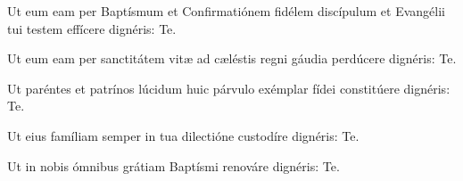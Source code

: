  Ut
\ifparvulus
eum
\else
eam
\fi
per Baptísmum et Confirmatiónem fidélem
discípulum et Evangélii tui testem effícere dignéris: \Rbardot{} Te.

 Ut
\ifparvulus
eum
\else
eam
\fi
per sanctitátem vitæ ad cæléstis regni gáudia
perdúcere dignéris: \Rbardot{} Te.

 Ut paréntes et patrínos lúcidum huic párvulo exémplar
fídei constitúere dignéris: \Rbardot{} Te.

 Ut eius famíliam semper in tua dilectióne custodíre
dignéris: \Rbardot{} Te.

 Ut in nobis ómnibus grátiam Baptísmi renováre dignéris: \Rbardot{} Te.
